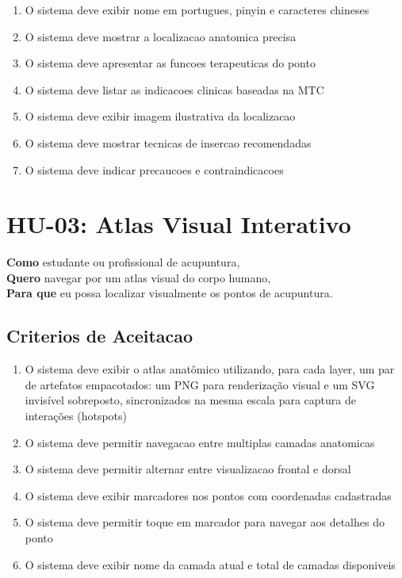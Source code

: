 \begin{apendicesenv}
\begin{enumerate}
    \item O sistema deve exibir nome em portugues, pinyin e caracteres chineses
    \item O sistema deve mostrar a localizacao anatomica precisa
    \item O sistema deve apresentar as funcoes terapeuticas do ponto
    \item O sistema deve listar as indicacoes clinicas baseadas na MTC
    \item O sistema deve exibir imagem ilustrativa da localizacao
    \item O sistema deve mostrar tecnicas de insercao recomendadas
    \item O sistema deve indicar precaucoes e contraindicacoes
\end{enumerate}


\section{HU-03: Atlas Visual Interativo}
\label{hu:atlas}

\textbf{Como} estudante ou profissional de acupuntura, \\
\textbf{Quero} navegar por um atlas visual do corpo humano, \\
\textbf{Para que} eu possa localizar visualmente os pontos de acupuntura.

\subsection*{Criterios de Aceitacao}

\begin{enumerate}
    \item O sistema deve exibir o atlas anatômico utilizando, para cada layer, um par de artefatos empacotados: um PNG para renderização visual e um SVG invisível sobreposto, sincronizados na mesma escala para captura de interações (hotspots)
    \item O sistema deve permitir navegacao entre multiplas camadas anatomicas
    \item O sistema deve permitir alternar entre visualizacao frontal e dorsal
    \item O sistema deve exibir marcadores nos pontos com coordenadas cadastradas
    \item O sistema deve permitir toque em marcador para navegar aos detalhes do ponto
    \item O sistema deve exibir nome da camada atual e total de camadas disponiveis
\end{enumerate}


\end{apendicesenv}
